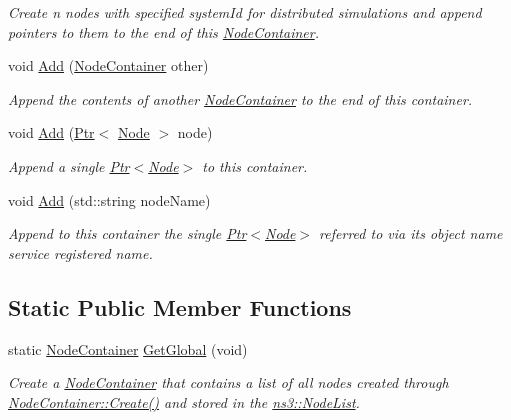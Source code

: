 \begin{DoxyCompactItemize}
\begin{DoxyCompactList}\small\item\em Create n nodes with specified system\+Id for distributed simulations and append pointers to them to the end of this \hyperlink{classns3_1_1NodeContainer}{Node\+Container}. \end{DoxyCompactList}\item 
void \hyperlink{classns3_1_1NodeContainer_aa60b3a0e70f2fb324e16ffcf8bf31fcb}{Add} (\hyperlink{classns3_1_1NodeContainer}{Node\+Container} other)
\begin{DoxyCompactList}\small\item\em Append the contents of another \hyperlink{classns3_1_1NodeContainer}{Node\+Container} to the end of this container. \end{DoxyCompactList}\item 
void \hyperlink{classns3_1_1NodeContainer_aba76adab3cab2d77a308c8335d70a667}{Add} (\hyperlink{classns3_1_1Ptr}{Ptr}$<$ \hyperlink{classns3_1_1Node}{Node} $>$ node)
\begin{DoxyCompactList}\small\item\em Append a single \hyperlink{classns3_1_1Ptr}{Ptr$<$\+Node$>$} to this container. \end{DoxyCompactList}\item 
void \hyperlink{classns3_1_1NodeContainer_ab27eb068a9c0fa07d4d5a6f44c2356c7}{Add} (std\+::string node\+Name)
\begin{DoxyCompactList}\small\item\em Append to this container the single \hyperlink{classns3_1_1Ptr}{Ptr$<$\+Node$>$} referred to via its object name service registered name. \end{DoxyCompactList}\end{DoxyCompactItemize}
\subsection*{Static Public Member Functions}
\begin{DoxyCompactItemize}
\item 
static \hyperlink{classns3_1_1NodeContainer}{Node\+Container} \hyperlink{classns3_1_1NodeContainer_a687e8f9ceb74d0ce3b06591c9f44c9ed}{Get\+Global} (void)
\begin{DoxyCompactList}\small\item\em Create a \hyperlink{classns3_1_1NodeContainer}{Node\+Container} that contains a list of {\itshape all} nodes created through \hyperlink{classns3_1_1NodeContainer_a787f059e2813e8b951cc6914d11dfe69}{Node\+Container\+::\+Create()} and stored in the \hyperlink{classns3_1_1NodeList}{ns3\+::\+Node\+List}. \end{DoxyCompactList}\end{DoxyCompactItemize}
